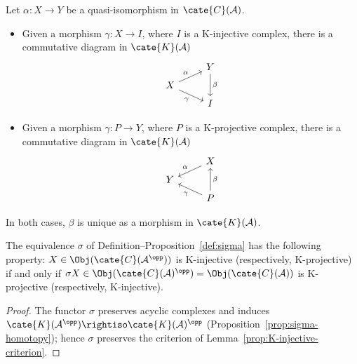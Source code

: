 \begin{theorem}\label{prop:K-resolution-homotopy}
	Let $\alpha:X\to Y$ be a quasi-isomorphism in
	$\cate{C}(\mathcal{A})$.
	\begin{itemize}
		\item Given a morphism $\gamma:X\to I$, where $I$ is a
		K-injective complex, there is a commutative diagram in
		$\cate{K}(\mathcal{A})$
		\[\begin{tikzcd}[row sep=tiny]
			& Y \arrow[dd, "\beta"] \\
			X \arrow[ru, "\alpha"] \arrow[rd, "\gamma"'] & \\
			& I
		\end{tikzcd}\]
		\item Given a morphism $\gamma:P\to Y$, where $P$ is a
		K-projective complex, there is a commutative diagram in
		$\cate{K}(\mathcal{A})$
		\[\begin{tikzcd}[row sep=tiny]
			& X \arrow[ld, "\alpha"'] \\
			Y & \\
			& P \arrow[lu, "\gamma"] \arrow[uu, "\beta"']
		\end{tikzcd}\]
	\end{itemize}
	In both cases, $\beta$ is unique as a morphism in
	$\cate{K}(\mathcal{A})$.
\end{theorem}

\begin{proposition}\label{prop:K-sigma-duality}
	The equivalence $\sigma$ of
	Definition--Proposition~\ref{def:sigma} has the following property:
	$X\in\Obj(\cate{C}(\mathcal{A}^{\opp}))$ is K-injective (respectively,
	K-projective) if and only if
	$\sigma X\in\Obj(\cate{C}(\mathcal{A})^{\opp})
	=\Obj(\cate{C}(\mathcal{A}))$ is K-projective (respectively,
	K-injective).
\end{proposition}

\begin{proof}
	The functor $\sigma$ preserves acyclic complexes and induces
	$\cate{K}(\mathcal{A}^{\opp})\rightiso
	\cate{K}(\mathcal{A})^{\opp}$
	(Proposition~\ref{prop:sigma-homotopy}); hence $\sigma$ preserves the
	criterion of Lemma~\ref{prop:K-injective-criterion}.
\end{proof}

